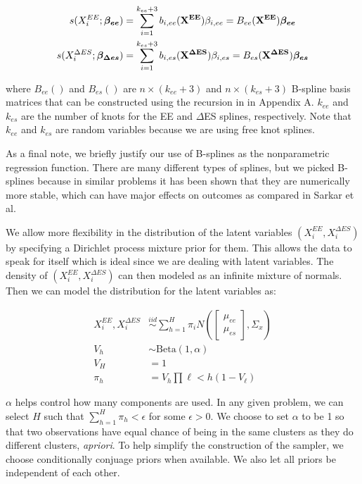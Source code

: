\documentclass[11pt]{article}\usepackage[]{graphicx}\usepackage[]{color}
\begin{document}
\begin{align}
  s(X_i^{EE};\boldsymbol{\beta_{ee}}) &= \sum_{i=1}^{k_{ee}+3} b_{i,ee}({\bf X^{EE}}) \beta_{i,ee} = B_{ee}({\bf X^{EE}}) \boldsymbol{\beta_{ee}}\\
  s(X_i^{\Delta ES};\boldsymbol{\beta_{\Delta es}}) &= \sum_{i=1}^{k_{es}+3} b_{i,es}({\bf X^{\Delta ES}}) \beta_{i,es} = B_{es}({\bf X^{\Delta ES}}) \boldsymbol{\beta_{es}}
\end{align}

where $B_{ee}()$ and $B_{es}()$ are $n\times (k_{ee}+3)$ and $n \times (k_{es}+3)$ B-spline basis matrices that can be constructed using the recursion in \cite{nonparametric} in Appendix A. $k_{ee}$ and $k_{es}$ are the number of knots for the EE and $\Delta$ES splines, respectively. Note that $k_{ee}$ and $k_{es}$ are random variables because we are using free knot splines.


As a final note, we briefly justify our use of B-splines as the nonparametric regression function. There are many different types of splines, but we picked B-splines because in similar problems it has been shown that they are numerically more stable, which can have major effects on outcomes as compared in Sarkar et al. \cite{sarkar14} 

We allow more flexibility in the distribution of the latent variables $(X_i^{EE},X_i^{\Delta ES})$ by specifying a Dirichlet process mixture prior for them. This allows the data to speak for itself which is ideal since we are dealing with latent variables. The density of $(X_i^{EE},X_i^{\Delta ES})$ can then modeled as an infinite mixture of normals.  Then we can model the distribution for the latent variables as:

\begin{align}
X_i^{EE},X_i^{\Delta ES} &\overset{iid}{\sim} \sum_{h=1}^{H} \pi_i N\left( 
  \begin{bmatrix}
  \mu_{ee} \\
  \mu_{es} 
  \end{bmatrix}
  ,
  \Sigma_x
    \right) \\
    V_h &\sim \text{Beta}(1,\alpha) \\
    V_H & = 1 \\
    \pi_h &= V_h \prod{\ell < h} (1-V_{\ell}) 
\end{align}


$\alpha$ helps control how many components are used. In any given problem, we can select $H$ such that $\sum_{h=1}^{H} \pi_h < \epsilon$ for some  $\epsilon > 0$. We choose to set $\alpha$ to be  1 so that two observations have equal chance of being in the same clusters as they do different clusters, \emph{apriori}.  To help simplify the construction of the sampler, we choose conditionally conjuage priors when available.  We also let  all priors be independent of each other. 
\end{document}
